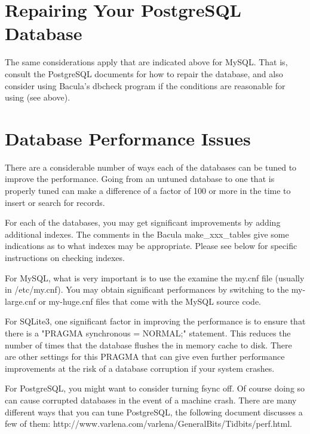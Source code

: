 \label{RepairingPSQL}
\section{Repairing Your PostgreSQL Database}

The same considerations apply that are indicated above for MySQL. That is,
consult the PostgreSQL documents for how to repair the database, and also
consider using Bacula's dbcheck program if the conditions are reasonable for
using (see above). 

\label{DatabasePerformance}
\section{Database Performance Issues}

There are a considerable number of ways each of the databases can be
tuned to improve the performance. Going from an untuned database to one
that is properly tuned can make a difference of a factor of 100 or more
in the time to insert or search for records.

For each of the databases, you may get significant improvements by adding
additional indexes. The comments in the Bacula make\_xxx\_tables give some
indications as to what indexes may be appropriate.  Please see below
for specific instructions on checking indexes.

For MySQL, what is very important is to use the examine the    
my.cnf file (usually in /etc/my.cnf).
You may obtain significant performances by switching to
the my-large.cnf or my-huge.cnf files that come with the MySQL source
code.

For SQLite3, one significant factor in improving the performance is
to ensure that there is a "PRAGMA synchronous = NORMAL;" statement.
This reduces the number of times that the database flushes the in memory
cache to disk. There are other settings for this PRAGMA that can 
give even further performance improvements at the risk of a database
corruption if your system crashes.

For PostgreSQL, you might want to consider turning fsync off.  Of course
doing so can cause corrupted databases in the event of a machine crash.
There are many different ways that you can tune PostgreSQL, the
following document discusses a few of them:
{http://www.varlena.com/varlena/GeneralBits/Tidbits/perf.html}.

